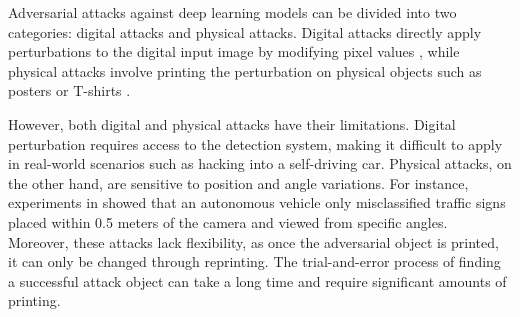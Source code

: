 
Adversarial attacks against deep learning models can be divided into two categories: digital attacks and physical attacks. Digital attacks directly apply perturbations to the digital input image by modifying pixel values \cite{han2023driving}, while physical attacks involve printing the perturbation on physical objects such as posters \cite{lee2019physical} or T-shirts \cite{xu2020adversarial}.

However, both digital and physical attacks have their limitations. Digital perturbation requires access to the detection system, making it difficult to apply in real-world scenarios such as hacking into a self-driving car. Physical attacks, on the other hand, are sensitive to position and angle variations. For instance, experiments in \cite{LuSFF17} showed that an autonomous vehicle only misclassified traffic signs placed within 0.5 meters of the camera and viewed from specific angles. Moreover, these attacks lack flexibility, as once the adversarial object is printed, it can only be changed through reprinting. The trial-and-error process of finding a successful attack object can take a long time and require significant amounts of printing.

